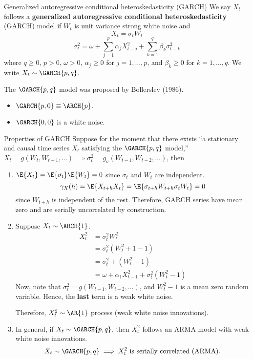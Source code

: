 \begin{Definition}{Generalized autoregressive conditional heteroskedasticity (GARCH)}{}
    We say $ X_t $ follows a \textbf{generalized autoregressive conditional heteroskedasticity}
    (GARCH) model
    if $ W_t $ is unit variance strong white noise and
    \[ X_t=\sigma_t W_t \]
    \[ \sigma_t^2=\omega+\sum_{j=1}^{p} \alpha_j X_{t-j}^2+\sum_{k=1}^{q} \beta_k \sigma_{t-k}^2 \]
    where $ q\ge 0 $, $ p>0 $, $ \omega>0 $, $ \alpha_j\ge 0 $ for $ j=1,\ldots,p $, and
    $ \beta_k\ge 0 $ for $ k=1,\ldots,q $.
    We write $ X_t \sim \GARCH{p,q} $.
\end{Definition}
\begin{Remark}{}{}
    The $ \GARCH{p,q} $ model was proposed by Bollerslev (1986).
\end{Remark}
\begin{Remark}{}{}
    \begin{itemize}
        \item $ \GARCH{p,0}\equiv \ARCH{p} $.
        \item $ \GARCH{0,0} $ is a white noise.
    \end{itemize}
\end{Remark}
\begin{Proposition}{Properties of GARCH}{}
    Suppose for the moment that there exists ``a stationary and causal time
    series $ X_t $ satisfying the $ \GARCH{p,q} $ model,''
    $ X_t=g(W_t,W_{t-1},\ldots)\implies \sigma_t^2=g_\sigma(W_{t-1},W_{t-2},\ldots) $,
    then
    \begin{enumerate}[(1)]
        \item $ \E{X_t}=\E{\sigma_t}\E{W_t}=0 $ since $ \sigma_t $ and $ W_t $ are
              independent.
              \[ \gamma_X(h)=\E{X_{t+h}X_t}=\E{\sigma_{t+h}W_{t+h}\sigma_t W_t}=0 \]
              since $ W_{t+h} $ is independent of the rest.
              Therefore,
              GARCH series have mean zero and are serially uncorrelated by construction.
        \item Suppose $ X_t \sim \ARCH{1} $.
              \begin{align*}
                  X_t^2
                   & =\sigma_t^2 W_{t}^2                             \\
                   & =\sigma_t^2(W_t^2+1-1)                          \\
                   & =\sigma_t^2+(W_t^2-1)                           \\
                   & =\omega+\alpha_1 X_{t-1}^2 +\sigma_t^2(W_t^2-1)
              \end{align*}
              Now, note that $ \sigma_t^2=g(W_{t-1},W_{t-2},\ldots) $,
              and $ W_t^2-1 $ is a mean zero random variable. Hence,
              the \textbf{last} term is a weak white noise.

              Therefore, $ X_t^2 \sim \AR{1} $ process (weak white noise innovations).
        \item In general, if $ X_t \sim \GARCH{p,q} $, then $ X_t^2 $
              follows an ARMA model with weak white noise innovations.
              \[ X_t \sim \GARCH{p,q}\implies X_t^2\text{ is serially correlated (ARMA).} \]
    \end{enumerate}
\end{Proposition}
